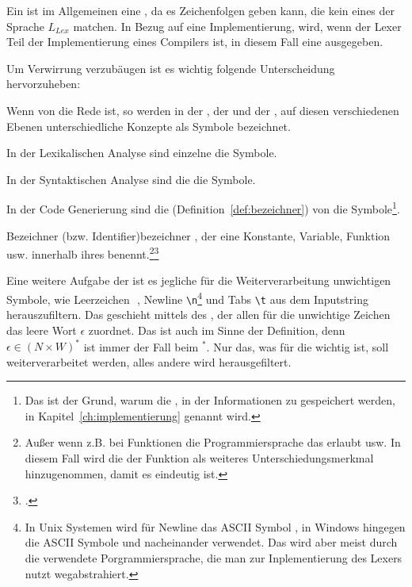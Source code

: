 Ein  ist im Allgemeinen eine , da es Zeichenfolgen geben kann, die kein  eines  der Sprache $L_{Lex}$ matchen. In Bezug auf eine Implementierung, wird, wenn der Lexer Teil der Implementierung eines Compilers ist, in diesem Fall eine  ausgegeben.

\begin{Special_Paragraph}
  Um Verwirrung verzubäugen ist es wichtig folgende Unterscheidung hervorzuheben:

  Wenn von  die Rede ist, so werden in der , der  und der , auf diesen verschiedenen Ebenen unterschiedliche Konzepte als Symbole bezeichnet.

  In der Lexikalischen Analyse sind einzelne  die Symbole.

  In der Syntaktischen Analyse sind die  die Symbole.

  In der Code Generierung sind die  (Definition~\ref{def:bezeichner}) von  die Symbole\footnote{Das ist der Grund, warum die , in der Informationen zu  gespeichert werden, in Kapitel~\ref{ch:implementierung}  genannt wird.}.
\end{Special_Paragraph}

\begin{Definition}{Bezeichner (bzw. Identifier)}{bezeichner}
  , der eine Konstante, Variable, Funktion usw. innerhalb ihres   benennt.\footnote{Außer wenn z.B. bei Funktionen die Programmiersprache das  erlaubt usw. In diesem Fall wird die  der Funktion als weiteres Unterschiedungsmerkmal hinzugenommen, damit es eindeutig ist.}\footcite{thiemann_einfuhrung_2018}
\end{Definition}

Eine weitere Aufgabe der  ist es jegliche für die Weiterverarbeitung unwichtigen Symbole, wie Leerzeichen \,\textvisiblespace\,, Newline \verb|\n|\footnote{In Unix Systemen wird für Newline das ASCII Symbol , in Windows hingegen die ASCII Symbole  und  nacheinander verwendet. Das wird aber meist durch die verwendete Porgrammiersprache, die man zur Inplementierung des Lexers nutzt wegabstrahiert.} und Tabs \verb|\t| aus dem Inputstring herauszufiltern. Das geschieht mittels des , der allen für die  unwichtige Zeichen das leere Wort $\epsilon$ zuordnet. Das ist auch im Sinne der Definition, denn $\epsilon \in (N\times W)^{*}$ ist immer der Fall beim  $^{*}$. Nur das, was für die  wichtig ist, soll weiterverarbeitet werden, alles andere wird herausgefiltert.

